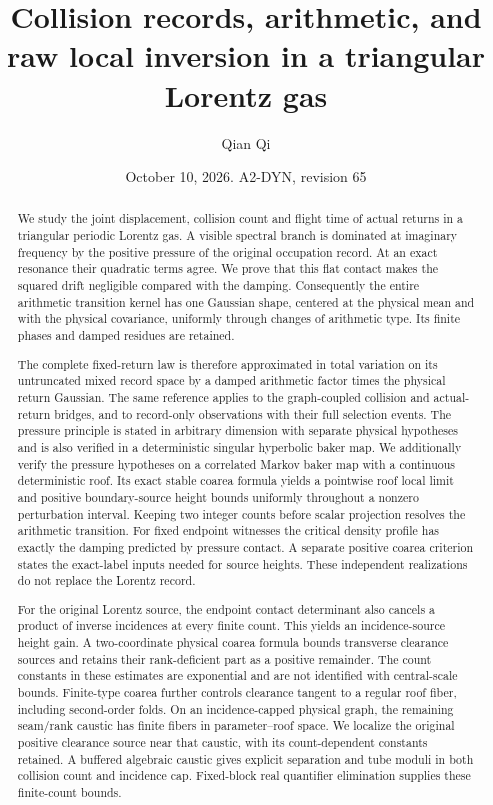 \documentclass[11pt,reqno]{amsart}
\title[Collision records and raw local inversion]{Collision records, arithmetic, and raw local inversion in a triangular Lorentz gas}
\author{Qian Qi}
\date{October 10, 2026. A2-DYN, revision 65}
\numberwithin{equation}{section}
\theoremstyle{definition}\newtheorem{definition}[theorem]{Definition}
\theoremstyle{remark}\newtheorem{remark}[theorem]{Remark}
\begin{document}
\raggedbottom
\begin{abstract}
We study the joint displacement, collision count and flight time of
actual returns in a triangular periodic Lorentz gas. A visible spectral
branch is dominated at imaginary frequency by the positive pressure
of the original occupation record. At an exact resonance their
quadratic terms agree. We prove that this flat contact makes the
squared drift negligible compared with the damping. Consequently the
entire arithmetic transition kernel has one Gaussian shape, centered
at the physical mean and with the physical covariance, uniformly
through changes of arithmetic type. Its finite phases and damped
residues are retained.

The complete fixed-return law is therefore approximated in total
variation on its untruncated mixed record space by a damped arithmetic
factor times the physical return Gaussian. The same reference applies
to the graph-coupled collision and actual-return bridges, and to
record-only observations with their full selection events. The pressure
principle is stated in arbitrary dimension with separate physical
hypotheses and is also verified in a deterministic singular hyperbolic
baker map. We additionally verify the pressure hypotheses on a
correlated Markov baker map with a continuous deterministic roof. Its
exact stable coarea formula yields a pointwise roof local limit and
positive boundary-source height bounds uniformly throughout a nonzero
perturbation interval. Keeping two integer counts before scalar projection
resolves the arithmetic transition. For fixed endpoint witnesses the
critical density profile has exactly the damping predicted by pressure
contact. A separate positive coarea criterion states the exact-label
inputs needed for source heights. These independent realizations
do not replace the Lorentz record.

For the original Lorentz source, the endpoint contact determinant also
cancels a product of inverse incidences at every finite count. This yields
an incidence-source height gain. A two-coordinate physical coarea formula
bounds transverse clearance sources and retains their rank-deficient
part as a positive remainder. The count constants in these estimates
are exponential and are not identified with central-scale bounds.
Finite-type coarea further controls clearance tangent to a regular
roof fiber, including second-order folds. On an incidence-capped
physical graph, the remaining seam/rank caustic has finite fibers in
parameter--roof space. We localize the original positive clearance
source near that caustic, with its count-dependent constants retained.
A buffered algebraic caustic gives explicit separation and tube moduli
in both collision count and incidence cap. Fixed-block real quantifier
elimination supplies these finite-count bounds.


\end{abstract}
\end{document}
